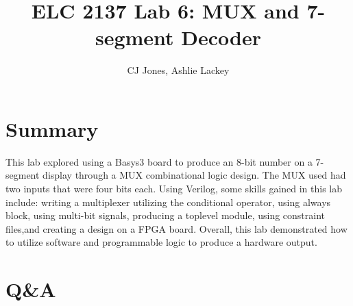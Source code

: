 \documentclass[11pt]{article}
\begin{document}
\title{ELC 2137 Lab 6: MUX and 7-segment Decoder}
\author{CJ Jones, Ashlie Lackey}

\maketitle


\section*{Summary}

This lab explored using a Basys3 board to produce an 8-bit number on a 7-segment display through a MUX combinational logic design. The MUX used had two inputs that were four bits each. Using Verilog, some skills gained in this lab include: writing a multiplexer utilizing the conditional operator, using always block, using multi-bit signals, producing a toplevel module, using constraint files,and creating a design on a FPGA board. Overall, this lab demonstrated how to utilize software and programmable logic to produce a hardware output.


\section*{Q\&A}
\end{document}
